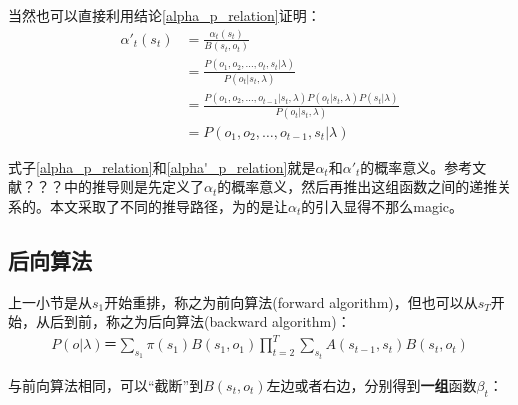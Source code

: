 \documentclass[11pt,a4paper]{article}
\numberwithin{equation}{section}
\begin{document}
当然也可以直接利用结论\eqref{alpha_p_relation}证明：
\begin{equation}
\begin{split}
\alpha'_t(s_t)
& = \frac{\alpha_t(s_t)}{B(s_t, o_t)}\\
& = \frac{P(o_1, o_2, \ldots, o_t, s_t | \lambda)}{P(o_t | s_t, \lambda)}\\
& = \frac{P(o_1, o_2, \ldots, o_{t - 1} | s_t, \lambda) P(o_t | s_t, \lambda) P(s_t | \lambda)}{P(o_t | s_t, \lambda)}\\
& = P(o_1, o_2, \ldots, o_{t - 1}, s_t | \lambda)
\end{split}
\end{equation}

式子\eqref{alpha_p_relation}和\eqref{alpha'_p_relation}就是$ \alpha_t $和$ \alpha'_t $的概率意义。参考文献？？？中的推导则是先定义了$ \alpha_t $的概率意义，然后再推出这组函数之间的递推关系的。本文采取了不同的推导路径，为的是让$ \alpha_t $的引入显得不那么magic。

\subsection{后向算法}
上一小节是从$ s_1 $开始重排，称之为前向算法(forward algorithm)，但也可以从$ s_T $开始，从后到前，称之为后向算法(backward algorithm)：
\begin{equation}\begin{split}
P(o | \lambda) ＝ \sum_{s_1} \pi(s_1) B(s_1, o_1) \prod_{t = 2}^T \sum_{s_t} A(s_{t - 1}, s_t) B(s_t, o_t)
\end{split}\end{equation}

与前向算法相同，可以“截断”到$ B(s_t, o_t) $左边或者右边，分别得到\textbf{一组}函数$ \beta_t $：
\end{document}
